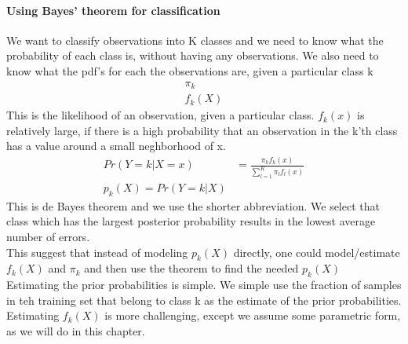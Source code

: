 \documentclass[../document.tex]{subfiles}
\begin{document}
	\paragraph{Using Bayes' theorem for classification}
	We want to classify observations into K classes and we need to know what the probability of each class is, without having any observations.
	We also need to know what the pdf's for each the observations are, given a particular class k
	\begin{equation}
	\begin{split}
		\pi_{k}\\
		f_{k}(X)
	\end{split}
	\end{equation}
	This is the likelihood of an observation, given a particular class. \(f_{k}(x)\) is relatively large, if there is a high probability that an observation in the k'th class has a value around a small neghborhood of x.
	\begin{equation}
	\begin{split}
		Pr(Y=k|X=x)&=\frac{\pi_{k}f_{k}(x)}{\sum_{l=1}^{K}\pi_{l}f_{l}(x)}\\
		p_{k}(X)=Pr(Y=k|X)&
	\end{split}
	\end{equation}
	This is de Bayes theorem and we use the shorter abbreviation. We select that class which has the largest posterior probability results in the lowest average number of errors.\\
	This suggest that instead of modeling \(p_{k}(X)\) directly, one could model/estimate \(f_{k}(X)\) and \(\pi_{k}\) and then use the theorem to find the needed \(p_{k}(X)\)\\
	Estimating the prior probabilities is simple. We simple use the fraction of samples in teh training set that belong to class k as the estimate of the prior probabilities.\\
	Estimating \(f_{k}(X)\) is more challenging, except we assume some parametric form, as we will do in this chapter.
\end{document}
